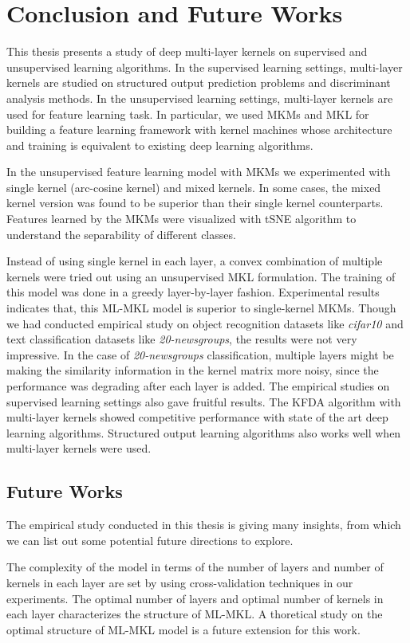\chapter{Conclusion and Future Works}
\label{chap_conc}
This thesis presents a study of deep multi-layer kernels on supervised and unsupervised learning algorithms. In the supervised learning settings, multi-layer kernels are studied on structured output prediction problems and discriminant analysis methods. In the unsupervised learning settings, multi-layer kernels are used for feature learning task. In particular, we used MKMs and MKL for building a feature learning framework with kernel machines whose architecture and training is equivalent to existing deep learning algorithms.

In the unsupervised feature learning model with MKMs we experimented with single kernel (arc-cosine kernel) and mixed kernels. In some cases, the mixed kernel version was found to be superior than their single kernel counterparts. Features learned by the MKMs were visualized with tSNE algorithm to understand the separability of different classes.

Instead of using single kernel in each layer, a convex combination of multiple kernels were tried out using an unsupervised MKL formulation. The training of this model was done in a greedy layer-by-layer fashion. Experimental results indicates that, this ML-MKL model is superior to single-kernel MKMs. Though we had conducted empirical study on object recognition datasets like \textit{cifar10} and text classification datasets like \textit{20-newsgroups}, the results were not very impressive. In the case of \textit{20-newsgroups} classification, multiple layers might be making the similarity information in the kernel matrix more noisy, since the performance was degrading after each layer is added.  The empirical studies on supervised learning settings also gave fruitful results. The KFDA algorithm with multi-layer kernels showed competitive performance with state of the art deep learning algorithms. Structured output learning algorithms also works well when multi-layer kernels were used.

\section{Future Works}
The empirical study conducted in this thesis is giving many insights, from which we can list out some potential future directions to explore.

The complexity of the model in terms of the number of layers and number of kernels in each layer are set by using  cross-validation techniques in our experiments. The optimal number of layers and optimal number of kernels in each layer characterizes the structure of ML-MKL. A thoretical study on the optimal structure of ML-MKL model is a future extension for this work.

